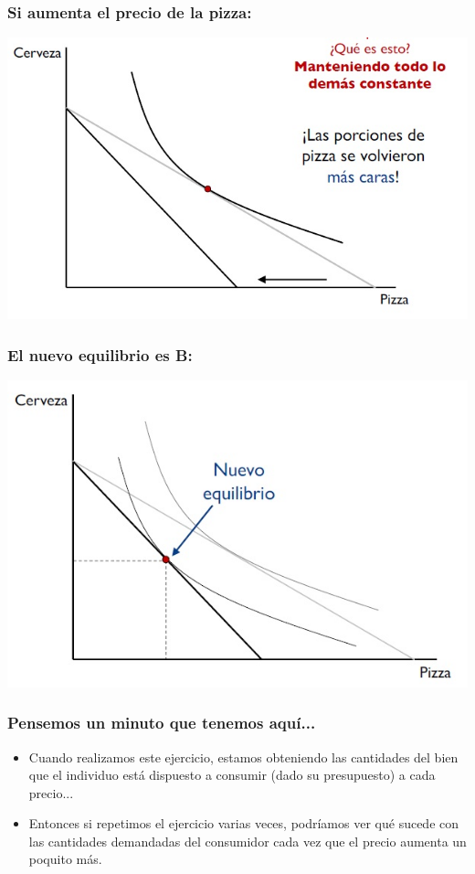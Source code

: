 \documentclass{beamer}
\begin{document}
\begin{frame}
\frametitle{Si aumenta el precio de la pizza:}
\centering
\includegraphics[scale=0.6]{Slides Principios de Economia/Figures/Tema_02.20_rp18.jpg}
\end{frame}

\begin{frame}
\frametitle{El nuevo equilibrio es B:}
\centering
\includegraphics[scale=0.6]{Slides Principios de Economia/Figures/Tema_02.22_rp20.jpg}
\end{frame}

\begin{frame}
\frametitle{Pensemos un minuto que tenemos aquí...}
\begin{itemize}
    \item Cuando realizamos este ejercicio, estamos obteniendo las cantidades del bien que el individuo está dispuesto a consumir (dado su presupuesto) a cada precio... \vspace{2mm}
    \item Entonces si repetimos el ejercicio varias veces, podríamos ver qué sucede con las cantidades demandadas del consumidor cada vez que el precio aumenta un poquito más.
\end{itemize}
\end{frame}
\end{document}
